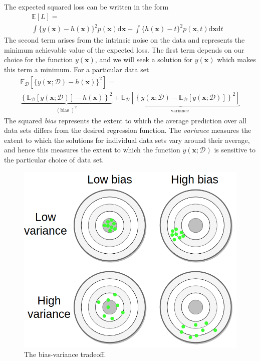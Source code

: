 \documentclass[5p,sort&compress]{elsarticle}
\begin{document}
The expected squared loss can be written in the form
\begin{equation}\begin{aligned}
\mathbb{E}[L]= & \\
\int\{y(\mathbf{x})-h(\mathbf{x})\}^{2} p(\mathbf{x}) \mathrm{d} \mathbf{x}+  \int\{h(\mathbf{x})-t\}^{2} p(\mathbf{x}, t) \mathrm{d} \mathbf{x} \mathrm{d} t
\end{aligned}
\end{equation}
The second term arises from the intrinsic noise on the data and represents the minimum achievable value of the expected loss. The first term depends on our choice for the function $y(\mathbf{x})$, and we will seek a solution for $y(\mathbf{x})$ which makes this term a minimum. For a particular data set \begin{equation}
\begin{aligned}{\mathbb{E}_{\mathcal{D}}\left[\{y(\mathbf{x} ; \mathcal{D})-h(\mathbf{x})\}^{2}\right] =} \\ {\underbrace{\left\{\mathbb{E}_{\mathcal{D}}[y(\mathbf{x} ; \mathcal{D})]-h(\mathbf{x})\right\}^{2}}_{(\text {bias })^{2}}+\underbrace{\mathbb{E}_{\mathcal{D}}\left[\left\{y(\mathbf{x} ; \mathcal{D})-\mathbb{E}_{\mathcal{D}}[y(\mathbf{x} ; \mathcal{D})]\right\}^{2}\right]}_{\text {variance }}}\end{aligned}
\end{equation}
The squared \textit{bias} represents the extent to which the average prediction over all data sets differs from the desired regression function. The \textit{variance} measures the extent to which the solutions for individual data sets vary around their average, and hence this measures the extent to which the function $y(\mathbf{x} ; \mathcal{D})$ is sensitive to the particular choice of data set.

\begin{figure}[ht]
     \centering
     \includegraphics[width = \linewidth]{figure/bias-variance-tradeoff.png}
     \caption{The bias-variance tradeoff.}
     \label{fig:tradeoff}
\end{figure}
\end{document}
